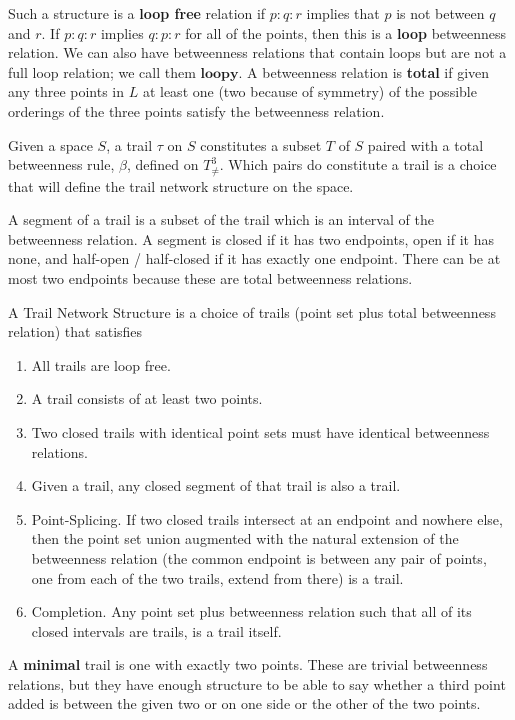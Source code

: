 \documentclass[12pt]{article}
\begin{document}
Such a structure is a \textbf{loop free} relation if $p:q:r$ implies that $p$ is not between $q$ and $r$. If $p:q:r$ implies $q:p:r$ for all of the points, then this is a \textbf{loop} betweenness relation.  We can also have betweenness relations that contain loops but are not a full loop relation; we call them $\textbf{loopy}$.  A betweenness relation is \textbf{total} if given any three points in $L$ at least one (two because of symmetry) of the possible orderings of the three points satisfy the betweenness relation. 

Given a space $S$, a trail $\tau$ on $S$ constitutes a subset $T$ of $S$ paired with a total betweenness rule, $\beta$, defined on $T^3_{\neq}$. Which pairs do constitute a trail is a choice that will define the trail network structure on the space. 

A segment of a trail is a subset of the trail which is an interval of the betweenness relation. A segment is closed if it has two endpoints, open if it has none, and half-open / half-closed if it has exactly one endpoint. There can be at most two endpoints because these are total betweenness relations. 

A Trail Network Structure is a choice of trails (point set plus total betweenness relation) that satisfies    
\begin{enumerate}
    \item All trails are loop free. 
    \item A trail consists of at least two points. 
    \item Two closed trails with identical point sets must have identical betweenness relations. 
    \item Given a trail, any closed segment of that trail is also a trail. 
    \item Point-Splicing. If two closed trails intersect at an endpoint and nowhere else, then the point set union augmented with the natural extension of the betweenness relation (the common endpoint is between any pair of points, one from each of the two trails, extend from there) is a trail. 
    \item Completion.  Any point set plus betweenness relation such that all of its closed intervals are trails, is a trail itself. 
\end{enumerate}


A \textbf{minimal} trail is one with exactly two points. These are trivial betweenness relations, but they have enough structure to be able to say whether a third point added is between the given two or on one side or the other of the two points. 
\end{document}
